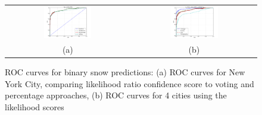 \begin{figure}
\begin{center}
\hspace{-0.25in}
\small{
\begin{tabular}{cc}
\includegraphics[width=0.40\textwidth,clip,trim=0.4in 0 0.8in 0]{plots/nyc_snow_ROC.png} &
\includegraphics[width=0.40\textwidth,clip,trim=0.4in 0 0.8in 0]{plots/city_cmp_snow_ROC.png} \\
(a) & (b)  
\end{tabular}
}
\end{center}
\vspace{-6pt}
\caption{ROC curves for binary snow predictions: (a) ROC curves for New York City, comparing likelihood
ratio confidence score to voting and percentage approaches, (b) ROC curves for 4 cities using the likelihood
scores}
\label{fig:city_roc}
\vspace{-6pt}
\end{figure}








%
%

